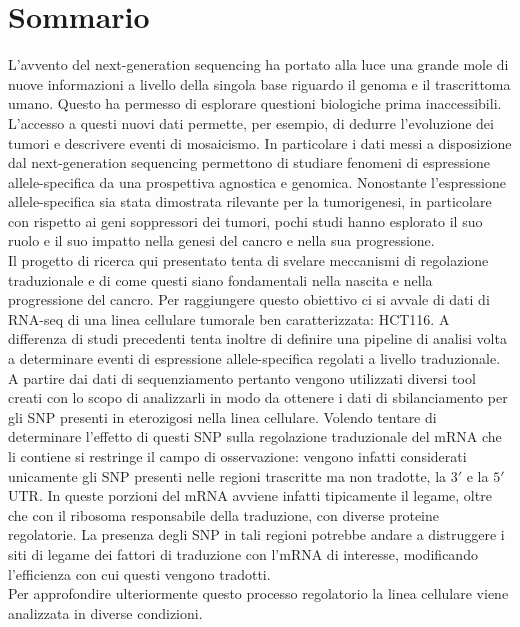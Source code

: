 \chapter*{Sommario} %
\label{sommario}

L'avvento del next-generation sequencing ha portato alla luce una grande mole di nuove informazioni a livello della singola base riguardo il genoma e il trascrittoma umano.
Questo ha permesso di esplorare questioni biologiche prima inaccessibili.
L'accesso a questi nuovi dati permette, per esempio, di dedurre l'evoluzione dei tumori e descrivere eventi di mosaicismo.
In particolare i dati messi a disposizione dal next-generation sequencing permettono di studiare fenomeni di espressione allele-specifica da una prospettiva agnostica e genomica.
Nonostante l'espressione allele-specifica sia stata dimostrata rilevante per la tumorigenesi, in particolare con rispetto ai geni soppressori dei tumori, pochi studi hanno esplorato il suo ruolo e il suo impatto nella genesi del cancro e nella sua progressione.\\[12pt]
Il progetto di ricerca qui presentato tenta di svelare meccanismi di regolazione traduzionale e di come questi siano fondamentali nella nascita e nella progressione del cancro.
Per raggiungere questo obiettivo ci si avvale di dati di RNA-seq di una linea cellulare tumorale ben caratterizzata: HCT116.
A differenza di studi precedenti tenta inoltre di definire una pipeline di analisi volta a determinare eventi di espressione allele-specifica regolati a livello traduzionale.
A partire dai dati di sequenziamento pertanto vengono utilizzati diversi tool creati con lo scopo di analizzarli in modo da ottenere i dati di sbilanciamento per gli SNP presenti in eterozigosi nella linea cellulare.
Volendo tentare di determinare l'effetto di questi SNP sulla regolazione traduzionale del mRNA che li contiene si restringe il campo di osservazione: vengono infatti considerati unicamente gli SNP presenti nelle regioni trascritte ma non tradotte, la $3'$ e la $5'$ UTR.
In queste porzioni del mRNA avviene infatti tipicamente il legame, oltre che con il ribosoma responsabile della traduzione, con diverse proteine regolatorie.
La presenza degli SNP in tali regioni potrebbe andare a distruggere i siti di legame dei fattori di traduzione con l'mRNA di interesse, modificando l'efficienza con cui questi vengono tradotti.\\
Per approfondire ulteriormente questo processo regolatorio la linea cellulare viene analizzata in diverse condizioni.
